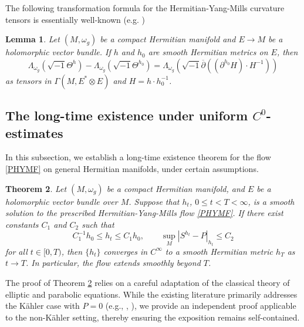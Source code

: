 \documentclass[12pt, reqno]{amsart}
\newcommand\bp{{\bar\partial}}
\theoremstyle{plain}
\newtheorem{thm}{Theorem}[section]
\newtheorem{lemma}[thm]{Lemma}
\theoremstyle{definition}
\newcommand{\btheorem}{\begin{thm}}
\newcommand{\etheorem}{\end{thm}}
\newcommand{\elemma}{\end{lemma}}
\newcommand{\blemma}{\begin{lemma}}
\newcommand{\sq}{\sqrt{-1}}
\newcommand{\p}{\partial}
\renewcommand{\bar}{\overline}
\newcommand{\beq}{\begin{equation}}
\newcommand{\eeq}{\end{equation}}
\renewcommand{\bp}{\bar{\partial}}
\newcommand{\ts}{\otimes}
\renewcommand{\>}{\rightarrow}
\renewcommand{\>}{\rightarrow}
\renewcommand{\p}{{\partial}}
\renewcommand{\bp}{{\bar{\partial}}}
\renewcommand{\bar}{\overline}
\newcommand{\smo}{\sqrt{-1}}
\numberwithin{equation}{section} %
\begin{document}
\noindent The following transformation formula for the
Hermitian-Yang-Mills curvature tensors is essentially well-known
(e.g. \cite[Proposition~2.8]{FWYY26+}) \blemma Let $(M,\omega_g)$ be
a compact  Hermitian manifold and $E\>M$ be a holomorphic vector
bundle. If $h$ and $h_0$ are smooth Hermitian metrics on $E$, then
\beq \Lambda_{\omega_g}\left(\sq  \Theta^{h}\right)-
\Lambda_{\omega_g}\left(\sq  \Theta^{h_0}\right)=
\Lambda_{\omega_g}\left(\smo\bp\left( (\p^{h_0} H) \cdot H^{-1}
\right)\right)\label{conformalchange1} \eeq as tensors in $\Gamma(M,E^*\ts
E)$ and $H=h\cdot h_0^{-1}$.

\elemma


\subsection{The long-time existence under uniform $C^0$-estimates} In this subsection, we establish a long-time existence theorem for the flow \eqref{PHYMF} on general Hermitian manifolds, under certain assumptions.

\btheorem\label{thm finite time extension}
Let $(M,\omega_g)$ be a compact Hermitian manifold, and $E$ be a holomorphic vector bundle over $M$.
Suppose that  $h_t$, $0\leq t<T<\infty$, is a smooth solution to the prescribed Hermitian-Yang-Mills flow \eqref{PHYMF}. If there exist constants $C_1$ and $C_2$ such that
\beq
C_1^{-1}h_0\leq h_t\leq C_1h_0,
\qquad
\sup_M\left|S^{h_t}-P\right|_{h_t}\leq C_2
\label{finite extension assumptions}
\eeq
for all $t\in[0,T)$, then $\{h_t\}$ converges in $C^\infty$ to a smooth Hermitian metric $h_T$ as $t\to T$. In particular, the flow extends smoothly beyond $T$.
\etheorem
\noindent
The proof of Theorem \ref{thm finite time extension} relies on a careful adaptation of the classical theory of elliptic and parabolic equations. While the existing literature primarily addresses the K\"ahler case with $P = 0$ (e.g., \cite{Don85}, \cite{Siu87}), we provide an independent proof applicable to the non-K\"ahler setting, thereby ensuring the exposition remains self-contained.\\
\end{document}
